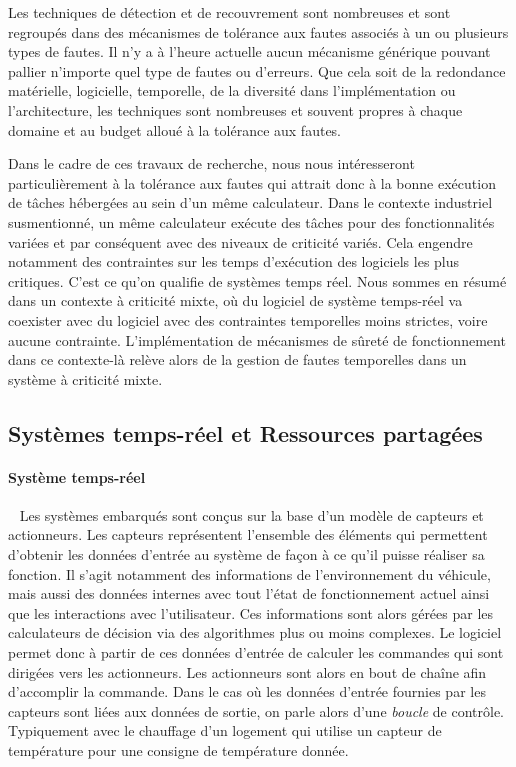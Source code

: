 \documentclass[french, a4paper, 11pt, twoside, pdftex]{StyleThese}
\begin{document}
		Les techniques de détection et de recouvrement sont nombreuses et sont regroupés dans des mécanismes de tolérance aux fautes associés à un ou plusieurs types de fautes. Il n’y a à l’heure actuelle aucun mécanisme générique pouvant pallier n’importe quel type de fautes ou d’erreurs. Que cela soit de la redondance matérielle, logicielle, temporelle, de la diversité dans l’implémentation ou l’architecture, les techniques sont nombreuses et souvent propres à chaque domaine et au budget alloué à la tolérance aux fautes.
		
		Dans le cadre de ces travaux de recherche, nous nous intéresseront particulièrement à la tolérance aux fautes qui attrait donc à la bonne exécution de tâches hébergées au sein d'un même calculateur. Dans le contexte industriel susmentionné, un même calculateur exécute des tâches pour des fonctionnalités variées et par conséquent avec des niveaux de criticité variés. Cela engendre notamment des contraintes sur les temps d'exécution des logiciels les plus critiques. C'est ce qu'on qualifie de systèmes temps réel. Nous sommes en résumé dans un contexte à criticité mixte, où du logiciel de système temps-réel va coexister avec du logiciel avec des contraintes temporelles moins strictes, voire aucune contrainte. L'implémentation de mécanismes de sûreté de fonctionnement dans ce contexte-là relève alors de la gestion de fautes temporelles dans un système à criticité mixte. 
		
\subsection{Systèmes temps-réel et Ressources partagées}
	\paragraph{Système temps-réel}~\label{sec:SystemesTempsReels}
		Les systèmes embarqués sont conçus sur la base d'un modèle de capteurs et actionneurs. Les capteurs représentent l'ensemble des éléments qui permettent d'obtenir les données d'entrée au système de façon à ce qu'il puisse réaliser sa fonction. Il s'agit notamment des informations de l'environnement du véhicule, mais aussi des données internes avec tout l'état de fonctionnement actuel ainsi que les interactions avec l'utilisateur. Ces informations sont alors gérées par les calculateurs de décision via des algorithmes plus ou moins complexes. Le logiciel permet donc à partir de ces données d'entrée de calculer les commandes qui sont dirigées vers les actionneurs. Les actionneurs sont alors en bout de chaîne afin d'accomplir la commande. Dans le cas où les données d'entrée fournies par les capteurs sont liées aux données de sortie, on parle alors d'une \emph{boucle} de contrôle. Typiquement avec le chauffage d'un logement qui utilise un capteur de température pour une consigne de température donnée.
		
\end{document}
